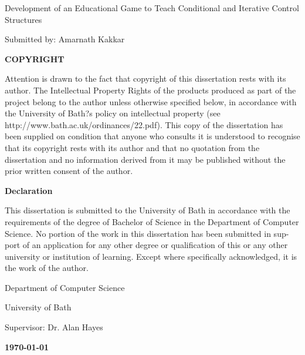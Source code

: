 \documentclass[a4paper,11.5pt]{report}
\numberwithin{figure}{section}
\numberwithin{table}{section}
\numberwithin{equation}{section}
\numberwithin{equation}{section}
\begin{document}
\newpage



    
\clearpage\thispagestyle{empty}
\begin{center}
\begin{minipage}{1\linewidth}
    \vspace{2cm}
    {\LARGE Development of an Educational Game to Teach Conditional and Iterative Control Structures \par}
    \vspace{1cm}	
    {\large Submitted by: Amarnath Kakkar\par}
	
    \vspace{1.5cm}
    {\Large \textbf{COPYRIGHT}\par}
    \vspace{0.5cm}
    {Attention is drawn to the fact that copyright of this dissertation rests with its author. The Intellectual Property Rights of the products produced as part of the project belong to the author unless otherwise specified below, in accordance with the University of Bath?s policy on intellectual property
(see http://www.bath.ac.uk/ordinances/22.pdf).
This copy of the dissertation has been supplied on condition that anyone who consults it is understood to recognise that its copyright rests with its author and that no quotation from the dissertation and no information derived from it may be published without the prior written consent of the author.\par}

     \vspace{0.5cm}
     {\Large \textbf{Declaration}\par}
      \vspace{0.5cm}
      {This dissertation is submitted to the University of Bath in accordance with the requirements of the degree of Bachelor of Science in the Department of Computer Science. No portion of the work in this dissertation has been submitted in sup- port of an application for any other degree or qualification of this or any other university or institution of learning. Except where specifically acknowledged, it is the work of the author.\par}
    
     \vspace{2.5cm}
    {\large Department of Computer Science\par}
    {\large University of Bath\par}
    \vspace{0.5cm}
    {\large Supervisor: Dr. Alan Hayes}\par
    {\large \textbf{\monthyeardate\today}\par}
    \vspace{1cm}
\end{minipage}
\end{center}
\end{document}

